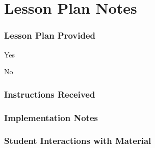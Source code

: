 \documentclass[10pt]{article}
\newcommand{\rulers}{\uline{\hfill\null }}
\begin{document}
\section*{Lesson Plan Notes}
\begin{framed}

\subsubsection*{Lesson Plan Provided}

\begin{todolist}
    \item Yes
    \item No
\end{todolist}

\subsubsection*{Instructions Received }
\begin{description}
    \item \rulers 
    \item \rulers 
    \item \rulers
    \item \rulers
    \item \rulers
\end{description}
\vspace{.25in}

\end{framed}

\pagebreak

\begin{framed}
\subsubsection*{Implementation Notes}
\begin{description}
    \item \rulers
    \item \rulers
    \item \rulers
\end{description}

\vspace{0.2in}

\subsubsection*{Student Interactions with Material}
\begin{description}
    \item \rulers
    \item \rulers
    \item \rulers
\end{description}
\vspace{0.2in}

\end{framed}
\end{document}
